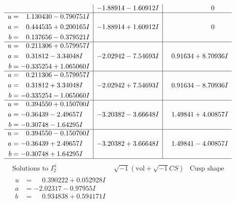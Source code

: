 \documentclass[1p]{elsarticle_modified}
\theoremstyle{definition}
\newcommand{\I}{\sqrt{-1}}
\begin{document}
$$\begin{array}{c|c|c}
 & -1.88914 - 1.60912 I & \phantom{-0.000000 } 0 \\ \hline\begin{aligned}
u &= \phantom{-}1.130430 - 0.790751 I \\
a &= \phantom{-}0.444535 + 0.200165 I \\
b &= \phantom{-}0.137656 - 0.379521 I\end{aligned}
 & -1.88914 + 1.60912 I & \phantom{-0.000000 } 0 \\ \hline\begin{aligned}
u &= \phantom{-}0.211306 + 0.579957 I \\
a &= \phantom{-}0.31812 - 3.34048 I \\
b &= -0.335254 + 1.065060 I\end{aligned}
 & -2.02942 - 7.54693 I & \phantom{-}0.91634 + 8.70936 I \\ \hline\begin{aligned}
u &= \phantom{-}0.211306 - 0.579957 I \\
a &= \phantom{-}0.31812 + 3.34048 I \\
b &= -0.335254 - 1.065060 I\end{aligned}
 & -2.02942 + 7.54693 I & \phantom{-}0.91634 - 8.70936 I \\ \hline\begin{aligned}
u &= \phantom{-}0.394550 + 0.150700 I \\
a &= -0.36439 - 2.49657 I \\
b &= -0.30748 - 1.64295 I\end{aligned}
 & -3.20382 - 3.66648 I & \phantom{-}1.49841 + 4.00857 I \\ \hline\begin{aligned}
u &= \phantom{-}0.394550 - 0.150700 I \\
a &= -0.36439 + 2.49657 I \\
b &= -0.30748 + 1.64295 I\end{aligned}
 & -3.20382 + 3.66648 I & \phantom{-}1.49841 - 4.00857 I\\
 \hline 
 \end{array}$$\newpage$$\begin{array}{c|c|c}  
\text{Solutions to }I^u_{2}& \I (\text{vol} + \sqrt{-1}CS) & \text{Cusp shape}\\
 \hline 
\begin{aligned}
u &= \phantom{-}0.390222 + 0.052928 I \\
a &= -2.02317 - 0.97955 I \\
b &= \phantom{-}0.934838 + 0.594171 I\end{aligned}

\end{array}$$
\end{document}
